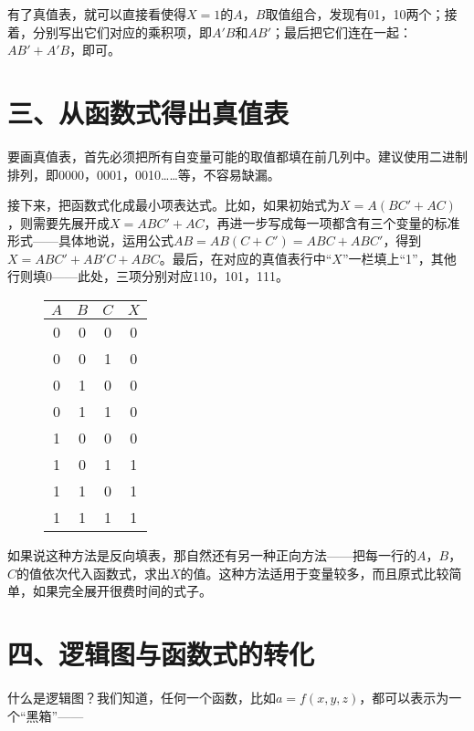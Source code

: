 \documentclass[UTF8]{ctexart}
\begin{document}
有了真值表，就可以直接看使得$X=1$的$A$，$B$取值组合，发现有01，10两个；接着，分别写出它们对应的乘积项，即$A'B$和$AB'$；最后把它们连在一起：$AB'+A'B$，即可。

\section*{三、从函数式得出真值表}

要画真值表，首先必须把所有自变量可能的取值都填在前几列中。建议使用二进制排列，即0000，0001，0010……等，不容易缺漏。

接下来，把函数式化成最小项表达式。比如，如果初始式为$X=A(BC'+AC)$，则需要先展开成$X=ABC'+AC$，再进一步写成每一项都含有三个变量的标准形式——具体地说，运用公式$AB=AB(C+C')=ABC+ABC'$，得到$X=ABC'+AB'C+ABC$。最后，在对应的真值表行中“$X$”一栏填上“1”，其他行则填0——此处，三项分别对应110，101，111。

\begin{figure}
    \begin{tabular}{|c|c|c|c|}\hline\rowcolor{lightgray}
        $A$ & $B$ & $C$ & $X$\\\hline
        0&0&0&0\\\hline
        0&0&1&0\\\hline
        0&1&0&0\\\hline
        0&1&1&0\\\hline
        1&0&0&0\\\hline
        1&0&1&1\\\hline
        1&1&0&1\\\hline
        1&1&1&1\\\hline
    \end{tabular}
\end{figure}

如果说这种方法是反向填表，那自然还有另一种正向方法——把每一行的$A$，$B$，$C$的值依次代入函数式，求出$X$的值。这种方法适用于变量较多，而且原式比较简单，如果完全展开很费时间的式子。

\section*{四、逻辑图与函数式的转化}

什么是逻辑图？我们知道，任何一个函数，比如$a=f(x,y,z)$，都可以表示为一个“黑箱”——

\begin{figure}
\end{figure}
\end{document}
